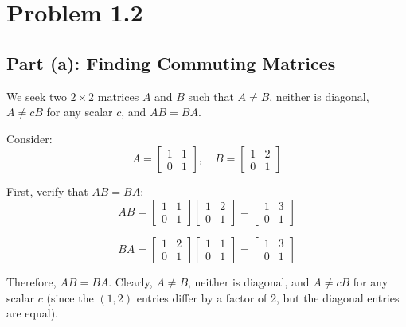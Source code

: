 \section*{Problem 1.2}

\subsection*{Part (a): Finding Commuting Matrices}

We seek two $2 \times 2$ matrices $A$ and $B$ such that $A \neq B$, neither is diagonal, $A \neq cB$ for any scalar $c$, and $AB = BA$.

Consider:
\begin{equation}
A = \begin{bmatrix} 1 & 1 \\ 0 & 1 \end{bmatrix}, \quad B = \begin{bmatrix} 1 & 2 \\ 0 & 1 \end{bmatrix}
\end{equation}

First, verify that $AB = BA$:
\begin{equation}
AB = \begin{bmatrix} 1 & 1 \\ 0 & 1 \end{bmatrix} \begin{bmatrix} 1 & 2 \\ 0 & 1 \end{bmatrix} = \begin{bmatrix} 1 & 3 \\ 0 & 1 \end{bmatrix}
\end{equation}

\begin{equation}
BA = \begin{bmatrix} 1 & 2 \\ 0 & 1 \end{bmatrix} \begin{bmatrix} 1 & 1 \\ 0 & 1 \end{bmatrix} = \begin{bmatrix} 1 & 3 \\ 0 & 1 \end{bmatrix}
\end{equation}

Therefore, $AB = BA$. Clearly, $A \neq B$, neither is diagonal, and $A \neq cB$ for any scalar $c$ (since the $(1,2)$ entries differ by a factor of 2, but the diagonal entries are equal).

